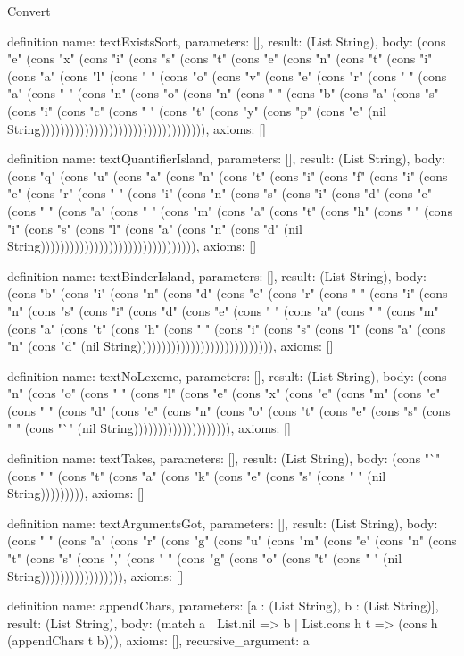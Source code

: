 \begin{lexlean}{Convert}
\begin{semanticmodule}
definition{
  name: textExistsSort,
  parameters: [],
  result: (List String),
  body: (cons "e" (cons "x" (cons "i" (cons "s" (cons "t" (cons "e" (cons "n" (cons "t" (cons "i" (cons "a" (cons "l" (cons " " (cons "o" (cons "v" (cons "e" (cons "r" (cons " " (cons "a" (cons " " (cons "n" (cons "o" (cons "n" (cons "-" (cons "b" (cons "a" (cons "s" (cons "i" (cons "c" (cons " " (cons "t" (cons "y" (cons "p" (cons "e" (nil String)))))))))))))))))))))))))))))))))),
  axioms: []
}

definition{
  name: textQuantifierIsland,
  parameters: [],
  result: (List String),
  body: (cons "q" (cons "u" (cons "a" (cons "n" (cons "t" (cons "i" (cons "f" (cons "i" (cons "e" (cons "r" (cons " " (cons "i" (cons "n" (cons "s" (cons "i" (cons "d" (cons "e" (cons " " (cons "a" (cons " " (cons "m" (cons "a" (cons "t" (cons "h" (cons " " (cons "i" (cons "s" (cons "l" (cons "a" (cons "n" (cons "d" (nil String)))))))))))))))))))))))))))))))),
  axioms: []
}

definition{
  name: textBinderIsland,
  parameters: [],
  result: (List String),
  body: (cons "b" (cons "i" (cons "n" (cons "d" (cons "e" (cons "r" (cons " " (cons "i" (cons "n" (cons "s" (cons "i" (cons "d" (cons "e" (cons " " (cons "a" (cons " " (cons "m" (cons "a" (cons "t" (cons "h" (cons " " (cons "i" (cons "s" (cons "l" (cons "a" (cons "n" (cons "d" (nil String)))))))))))))))))))))))))))),
  axioms: []
}

definition{
  name: textNoLexeme,
  parameters: [],
  result: (List String),
  body: (cons "n" (cons "o" (cons " " (cons "l" (cons "e" (cons "x" (cons "e" (cons "m" (cons "e" (cons " " (cons "d" (cons "e" (cons "n" (cons "o" (cons "t" (cons "e" (cons "s" (cons " " (cons "`" (nil String)))))))))))))))))))),
  axioms: []
}

definition{
  name: textTakes,
  parameters: [],
  result: (List String),
  body: (cons "`" (cons " " (cons "t" (cons "a" (cons "k" (cons "e" (cons "s" (cons " " (nil String))))))))),
  axioms: []
}

definition{
  name: textArgumentsGot,
  parameters: [],
  result: (List String),
  body: (cons " " (cons "a" (cons "r" (cons "g" (cons "u" (cons "m" (cons "e" (cons "n" (cons "t" (cons "s" (cons "," (cons " " (cons "g" (cons "o" (cons "t" (cons " " (nil String))))))))))))))))),
  axioms: []
}

definition{
  name: appendChars,
  parameters: [a : (List String), b : (List String)],
  result: (List String),
  body: (match a
    | List.nil => b
    | List.cons h t => (cons h (appendChars t b))),
  axioms: [],
  recursive_argument: a
}


\end{semanticmodule}
\end{lexlean}
